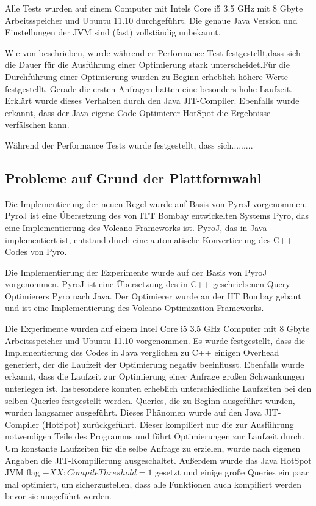 Alle Tests wurden auf einem Computer mit Intels Core i5 3.5 GHz mit 8 Gbyte Arbeitsspeicher und Ubuntu 11.10 durchgeführt. Die genaue Java Version und Einstellungen der JVM sind (fast) vollständig unbekannt.

Wie von \cite{shanbhag2014optimizing} beschrieben, wurde während er Performance Test festgestellt,dass sich die Dauer für die Ausführung einer Optimierung stark unterscheidet.Für die Durchführung einer Optimierung wurden zu Beginn erheblich höhere Werte festgestellt. Gerade die ersten Anfragen hatten eine besonders hohe Laufzeit. Erklärt wurde dieses Verhalten durch den Java \ac{JIT}-Compiler. Ebenfalls wurde erkannt, dass der Java eigene Code Optimierer HotSpot die Ergebnisse verfälschen kann. 

Während der Performance Tests wurde festgestellt, dass sich.........


\subsection{Probleme auf Grund der Plattformwahl}
Die Implementierung der neuen Regel wurde auf Basis von PyroJ vorgenommen. PyroJ ist eine Übersetzung des von ITT Bombay entwickelten Systems Pyro, das eine Implementierung des Volcano-Frameworks ist. PyroJ, das in Java implementiert ist, entstand durch eine automatische Konvertierung des C++ Codes von Pyro. 

Die Implementierung der Experimente wurde auf der Basis von PyroJ vorgenommen. PyroJ ist eine Übersetzung des in C++ geschriebenen Query Optimierers Pyro nach Java. Der Optimierer wurde an der IIT Bombay gebaut und ist eine Implementierung des Volcano Optimization Frameworks.

Die Experimente wurden auf einem Intel Core i5 3.5 GHz Computer mit 8 Gbyte Arbeitsspeicher und Ubuntu 11.10 vorgenommen. Es wurde festgestellt, dass die Implementierung des Codes in Java verglichen zu C++ einigen Overhead generiert, der die Laufzeit der Optimierung negativ beeinflusst. Ebenfalls wurde erkannt, dass die Laufzeit zur Optimierung einer Anfrage großen Schwankungen unterlegen ist. Insbesondere konnten erheblich unterschiedliche Laufzeiten bei den selben Queries festgestellt werden. Queries, die zu Beginn ausgeführt wurden, wurden langsamer ausgeführt. Dieses Phänomen wurde auf den Java JIT-Compiler (HotSpot) zurückgeführt. Dieser kompiliert nur die zur Ausführung notwendigen Teile des Programms und führt Optimierungen zur Laufzeit durch. Um konstante Laufzeiten für die selbe Anfrage zu erzielen, wurde nach eigenen Angaben die JIT-Kompilierung ausgeschaltet. Außerdem wurde das Java HotSpot JVM flag $-XX:CompileThreshold=1$ gesetzt und einige große Queries ein paar mal optimiert, um sicherzustellen, dass alle Funktionen auch kompiliert werden bevor sie ausgeführt werden.
 


